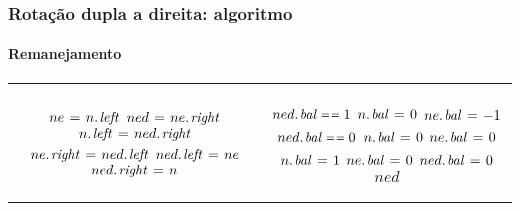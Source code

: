 \documentclass{beamer}
\begin{document}
\begin{frame}

\frametitle{Rotação dupla a direita: algoritmo}
\framesubtitle{Remanejamento}

\begin{tabular}{cc}
\begin{minipage}[t]{.5\textwidth}
\begin{codebox}
\Procname{$\proc{Rotate-Double-Right}(n)$}
\zi $ne \gets \attrib{n}{left}$
\zi $ned \gets \attrib{ne}{right}$
\zi $\attrib{n}{left} \gets \attrib{ned}{right}$
\zi $\attrib{ne}{right} \gets \attrib{ned}{left}$
\zi $\attrib{ned}{left} \gets ne$
\zi $\attrib{ned}{right} \gets n$
\end{codebox}
\end{minipage}
&\begin{minipage}[t]{.45\textwidth}
\begin{codebox}
\zi \If $\attrib{ned}{bal} \isequal 1$
\zi \Then $\attrib{n}{bal} \gets 0$
\zi   $\attrib{ne}{bal} \gets -1$
\zi \Else \If $\attrib{ned}{bal} \isequal 0$
\zi \Then $\attrib{n}{bal} \gets 0$
\zi   $\attrib{ne}{bal} \gets 0$
\zi \Else
\zi   $\attrib{n}{bal} \gets 1$
\zi   $\attrib{ne}{bal} \gets 0$
\zi $\attrib{ned}{bal} \gets 0$
\zi \Return $ned$
\end{codebox}
\end{minipage}
\end{tabular}



\end{frame}
\end{document}
